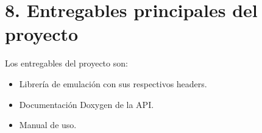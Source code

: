 \section{8. Entregables principales del proyecto}
\label{sec:8-entregables-principales-del-proyecto}

Los entregables del proyecto son:

\begin{itemize}
	\item Librería de emulación con sus respectivos headers.
	\item Documentación Doxygen de la API.
	\item Manual de uso.
\end{itemize}

